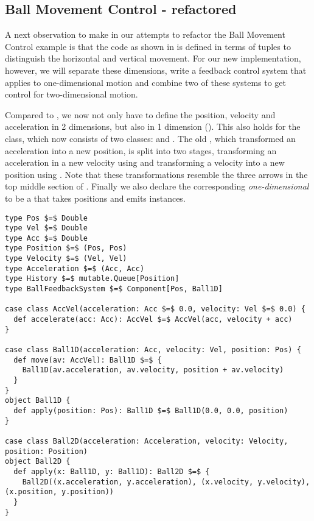 \subsection{Ball Movement Control - refactored}
A next observation to make in our attempts to refactor the Ball Movement Control example is that the code as shown in  is defined in terms of tuples to distinguish the horizontal and vertical movement. For our new implementation, however, we will separate these dimensions, write a feedback control system that applies to one-dimensional motion and combine two of these systems to get control for two-dimensional motion.

Compared to , we now not only have to define the position, velocity and acceleration in 2 dimensions, but also in 1 dimension (). This also holds for the  class, which now consists of two classes:  and . The old , which transformed an acceleration into a new position, is split into two stages, transforming an acceleration in a new velocity using  and transforming a velocity into a new position using . Note that these transformations resemble the three arrows in the top middle section of . Finally we also declare the corresponding \emph{one-dimensional}  to be a \comp that takes positions and emits  instances. 

\begin{minipage}{\linewidth}
\begin{lstlisting}[style=ScalaStyle, caption={Ball motion physics}, label={lst:ball-physics-new}]
type Pos $=$ Double
type Vel $=$ Double
type Acc $=$ Double
type Position $=$ (Pos, Pos)
type Velocity $=$ (Vel, Vel)
type Acceleration $=$ (Acc, Acc)
type History $=$ mutable.Queue[Position]
type BallFeedbackSystem $=$ Component[Pos, Ball1D]

case class AccVel(acceleration: Acc $=$ 0.0, velocity: Vel $=$ 0.0) {
  def accelerate(acc: Acc): AccVel $=$ AccVel(acc, velocity + acc)
}

case class Ball1D(acceleration: Acc, velocity: Vel, position: Pos) {
  def move(av: AccVel): Ball1D $=$ {
    Ball1D(av.acceleration, av.velocity, position + av.velocity)
  }
}
object Ball1D {
  def apply(position: Pos): Ball1D $=$ Ball1D(0.0, 0.0, position)
}

case class Ball2D(acceleration: Acceleration, velocity: Velocity, position: Position)
object Ball2D {
  def apply(x: Ball1D, y: Ball1D): Ball2D $=$ {
    Ball2D((x.acceleration, y.acceleration), (x.velocity, y.velocity), (x.position, y.position))
  }
}
\end{lstlisting}
\end{minipage}

